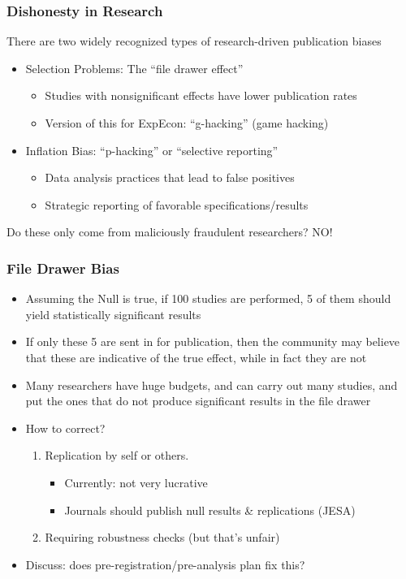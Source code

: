 \begin{frame}
\frametitle{Dishonesty in Research}
There are two widely recognized types of research-driven publication biases
\begin{itemize}
\item Selection Problems: The “file drawer effect”
\begin{itemize}
    \item Studies with nonsignificant effects have lower publication rates
    \item Version of this for ExpEcon: ``g-hacking'' (game hacking)
\end{itemize}
\item Inflation Bias: “p-hacking” or “selective reporting”
\begin{itemize}
    \item Data analysis practices that lead to false positives
    \item Strategic reporting of favorable specifications/results
\end{itemize}
\end{itemize}
\br

Do these only come from maliciously fraudulent researchers? NO!
\end{frame}


\begin{frame}
\frametitle{File Drawer Bias}
\begin{itemize}
\item Assuming the Null is true, if 100 studies are performed, 5 of them should yield statistically significant results
\item If only these 5 are sent in for publication, then the community may believe that these are indicative of the true effect, while in fact they are not
\item Many researchers have huge budgets, and can carry out many studies, and put the ones that do not produce significant results in the file drawer
\item How to correct? 
\begin{enumerate}
    \item Replication by self or others. 
    \begin{itemize}
        \item Currently: not very lucrative
        \item Journals should publish null results \& replications (JESA)
    \end{itemize}
    \item Requiring robustness checks (but that's unfair)
\end{enumerate}
\item Discuss: does pre-registration/pre-analysis plan fix this?
\end{itemize}
\end{frame}



